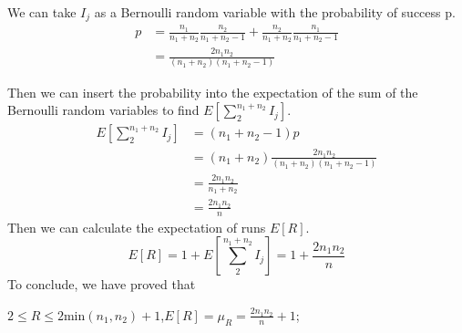 \documentclass[a4paper,12pt]{article}
\begin{document}
\noindent We can take $I_j$ as a Bernoulli random variable with the probability of success p.
\begin{equation}
\begin{split}
p&=\frac{n_1}{n_1+n_2}\frac{n_2}{n_1+n_2-1}+\frac{n_2}{n_1+n_2}\frac{n_1}{n_1+n_2-1}\\
&=\frac{2n_1n_2}{(n_1+n_2)(n_1+n_2-1)}
\end{split}
\end{equation}

\noindent Then we can insert the probability into the expectation of the sum of the Bernoulli random variables to find $E[\sum_2^{n_1+n_2}I_j]$.
\begin{equation}
\begin{split}
E[\sum_2^{n_1+n_2}I_j]&=(n_1+n_2-1)p\\
	&=(n_1+n_2)\frac{2n_1n_2}{(n_1+n_2)(n_1+n_2-1)}\\
	&=\frac{2n_1n_2}{n_1+n_2}\\
	&=\frac{2n_1n_2}{n}
\end{split}
\end{equation}
\noindent Then we can calculate the expectation of runs $E[R]$.
\begin{equation}
E[R]=1+E[\sum_2^{n_1+n_2}I_j]=1+\frac{2n_1n_2}{n}
\end{equation}
To conclude, we have proved that
\begin{center}
$2\leq R\leq 2$min$(n_1,n_2)+1$,\qquad $E[R]=\mu_R=\frac{2n_1n_2}{n}+1$;
\end{center}
\end{document}
